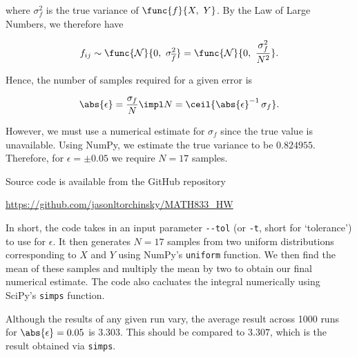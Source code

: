where $\sigma_f^2$ is the true variance of $\func{f}{X,\ Y}$. By the Law of Large Numbers, we therefore have

\begin{equation}
	f_{ij} \sim \func{\mathcal{N}}{0,\ \sigma_{\overline{f}}^2} = \func{\mathcal{N}}{0,\ \frac{\sigma_{f}^2}{N^2}}.
\end{equation}

Hence, the number of samples required for a given error is

\begin{equation}
	\abs{\epsilon} = \frac{\sigma_f}{N} \impl N = \ceil{\abs{\epsilon}^{-1}\,\sigma_f}.
\end{equation}

However, we must use a numerical estimate for $\sigma_f$ since the true value is unavailable. Using NumPy, we estimate the true variance to be $0.824955$. Therefore, for $\epsilon = \pm 0.05$ we require $N = 17$ samples.

Source code is available from the GitHub repository
	
\begin{center}
	\url{https://github.com/jasonltorchinsky/MATH833_HW}
\end{center}

In short, the code takes in an input parameter \texttt{-{}-tol} (or \texttt{-t}, short for `tolerance') to use for $\epsilon$. It then generates $N = 17$ samples from two uniform distributions corresponding to $X$ and $Y$ using NumPy's \texttt{uniform} function. We then find the mean of these samples and multiply the mean by two to obtain our final numerical estimate. The code also cacluates the integral numerically using SciPy's \texttt{simps} function.

Although the results of any given run vary, the average result across 1000 runs for $\abs{\epsilon} = 0.05$ is $3.303$. This should be compared to $3.307$, which is the result obtained via \texttt{simps}.